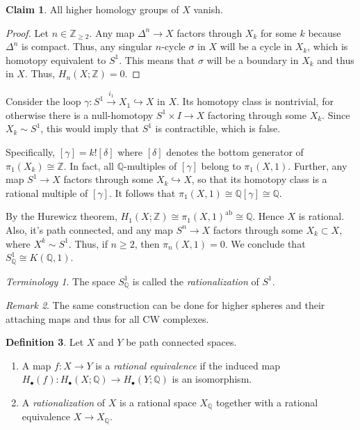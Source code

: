 \documentclass[10pt,letterpaper,cm]{nupset}
\theoremstyle{definition}
\newtheorem{defn}{Definition}[subsection]
\theoremstyle{theorem}
\newtheorem{claim}[defn]{Claim}
\theoremstyle{remark}
\newtheorem{remark}[defn]{Remark}
\newtheorem*{term}{Terminology}
\newcommand{\Q}{\mathbb Q}
\newcommand{\Z}{\mathbb Z}
\newcommand{\1}{\mathbb{1}}
\newcommand{\0}{\vec 0}
\DeclareMathOperator{\ab}{ab}
\newcommand{\be}{\begin{enumerate}}
\newcommand{\ee}{\end{enumerate}}
\begin{document}
\begin{claim}
All higher homology groups of $X$ vanish.
\end{claim}
\begin{proof}
Let $n\in \Z_{\geq 2}$. Any map $\Delta^n \to X$ factors through $X_k$ for some $k$ because $\Delta^n$ is compact. Thus, any singular $n$-cycle $\sigma$ in $X$ will be a cycle in $X_k$, which is homotopy equivalent to $S^1$. This means that  $\sigma $ will be a boundary in $X_k$ and thus in $X$. Thus, $H_n(X;\Z) =0$.
\end{proof}

Consider the loop $\gamma : S^1 \xrightarrow{i_1} X_1 \hookrightarrow X$ in $X$. Its homotopy class is nontrivial, for otherwise there is a null-homotopy $S^1 \times I \to X$ factoring through some $X_k$. Since $X_k \sim S^1$, this would imply that $S^1$ is contractible, which is false. 

\medskip

Specifically, $\left[\gamma\right] = k!\left[\delta\right]$ where $\left[\delta\right]$ denotes the bottom generator of $\pi_1(X_k)\cong \Z$. In fact, all $\Q$-multiples of $\left[\gamma\right]$ belong to $\pi_1(X,1)$. Further, any map $S^1 \to X$ factors through some $X_k \hookrightarrow X$, so that its homotopy class is a rational multiple of $\left[\gamma\right]$. It follows that $\pi_1(X,1) \cong \Q\left[\gamma\right] \cong \Q$.

\medskip

By the Hurewicz theorem, $H_1(X;\Z) \cong \pi_1(X,1)^{\ab} \cong \Q$. Hence $X$ is rational.  Also, it's path connected, and any map $S^n \to X$ factors through some $X_k \subset X$, where $X^k \sim S^1$. Thus, if $n\geq 2$, then $\pi_n(X, 1) =0$. We conclude that $S^1_{\Q} \cong K(\Q,1)$.

\begin{term}
The space $S^1_{\Q}$ is called the \textit{rationalization} of $S^1$.
\end{term}

\begin{remark}
The same construction can be done for higher spheres and their attaching maps and thus for all CW complexes.
\end{remark}

\begin{defn}\label{ratz} Let $X$ and $Y$ be path connected spaces.
\be
\item A map $f: X \to Y$ is a  \textit{rational equivalence} if the induced map $H_{\bullet}(f) : H_{\bullet}(X;\Q) \to H_{\bullet}(Y;\Q)$ is an isomorphism. 
\item A \textit{rationalization} of $X$ is a rational space $X_{\Q}$ together with a rational equivalence $X \to X_{\Q}$. 
\ee
\end{defn}
\end{document}
